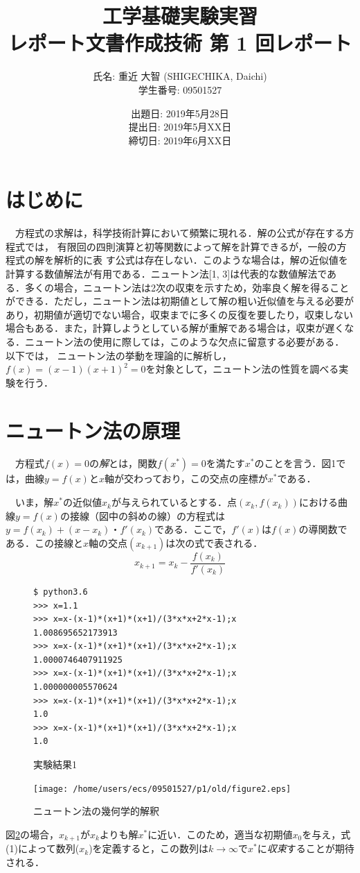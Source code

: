 \documentclass[a4j,11pt]{jarticle}
\title{工学基礎実験実習 \\
       レポート文書作成技術 第 1 回レポート}
\author{氏名: 重近 大智 (SHIGECHIKA, Daichi) \\
        学生番号: 09501527}
\date{出題日: 2019年5月28日 \\
      提出日: 2019年5月XX日 \\
      締切日: 2019年6月XX日 \\}
\begin{document}
\maketitle

\section{はじめに}
　方程式の求解は，科学技術計算において頻繁に現れる．解の公式が存在する方程式では，
有限回の四則演算と初等関数によって解を計算できるが，一般の方程式の解を解析的に表
す公式は存在しない．このような場合は，解の近似値を計算する数値解法が有用である．ニュートン法[1, 3]は代表的な数値解法である．多くの場合，ニュートン法は2次の収束を示すため，効率良く解を得ることができる．ただし，ニュートン法は初期値として解の粗い近似値を与える必要があり，初期値が適切でない場合，収束までに多くの反復を要したり，収束しない場合もある．また，計算しようとしている解が重解である場合は，収束が遅くなる．ニュートン法の使用に際しては，このような欠点に留意する必要がある．
以下では， ニュートン法の挙動を理論的に解析し，$f(x)=(x-1)(x+1)^2=0$を対象として，ニュートン法の性質を調べる実験を行う．
\section{ニュートン法の原理}
　方程式$f(x)=0$の{\em 解}とは，関数$f(x^*)=0$を満たす$x^*$のことを言う．図1では，曲線$y=f(x)$と$x$軸が交わっており，この交点の座標が$x^*$である．

　いま，解$x^*$の近似値$x_k$が与えられているとする．点$(x_k,f(x_k))$における曲線$y=f(x)$の接線（図中の斜めの線）の方程式は$y=f(x_k)+(x-x_k)・f'(x_k)$である．ここで，$f'(x)$は$f(x)$の導関数である．この接線と$x$軸の交点$(x_{k+1})$は次の式で表される\cite{author2,author3}．
\begin{equation}
x_{k+1}=x_k-\frac{f(x_k)}{f'(x_k)}
\label{eq:newton}
\end{equation}
\begin{figure}[h]
\begin{verbatim}
$ python3.6
>>> x=1.1
>>> x=x-(x-1)*(x+1)*(x+1)/(3*x*x+2*x-1);x
1.008695652173913
>>> x=x-(x-1)*(x+1)*(x+1)/(3*x*x+2*x-1);x
1.0000746407911925
>>> x=x-(x-1)*(x+1)*(x+1)/(3*x*x+2*x-1);x
1.000000005570624
>>> x=x-(x-1)*(x+1)*(x+1)/(3*x*x+2*x-1);x
1.0
>>> x=x-(x-1)*(x+1)*(x+1)/(3*x*x+2*x-1);x
1.0
\end{verbatim}
\caption{実験結果1}
\label{result}
\end{figure}
\begin{figure}[h]
\texttt{[image: /home/users/ecs/09501527/p1/old/figure2.eps]}
\caption{ニュートン法の幾何学的解釈}
\label{fig:newton}
\end{figure}
図\ref{fig:newton}の場合，$x_{k+1}$が$x_k$よりも解$x^*$に近い．このため，適当な初期値$x_0$を与え，式(1)によって数列($x_k$)を定義すると，この数列は$k\rightarrow \infty$で$x^*$に{\em 収束}することが期待される．
\end{document}
